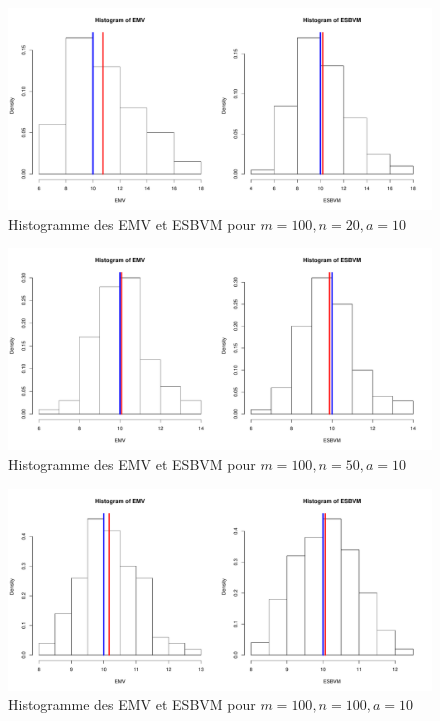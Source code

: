 \documentclass[12pt]{article}
\begin{document}
\begin{enumerate}
\begin{figure}[ht]
\centering
\includegraphics[width=1.0\textwidth]{figures/GraphP2Q32.pdf}
\caption{Histogramme des EMV et ESBVM pour $m=100, n=20,   a=10$}
\end{figure}

\begin{figure}[ht]
\centering
\includegraphics[width=1.0\textwidth]{figures/GraphP2Q33.pdf}
\caption{Histogramme des EMV et ESBVM pour $m=100, n=50, a=10$}
\end{figure}

\begin{figure}[ht]
\centering
\includegraphics[width=1.0\textwidth]{figures/GraphP2Q34.pdf}
\caption{Histogramme des EMV et ESBVM pour $m=100, n=100, a=10$}
\end{figure}


\end{enumerate}
\end{document}

